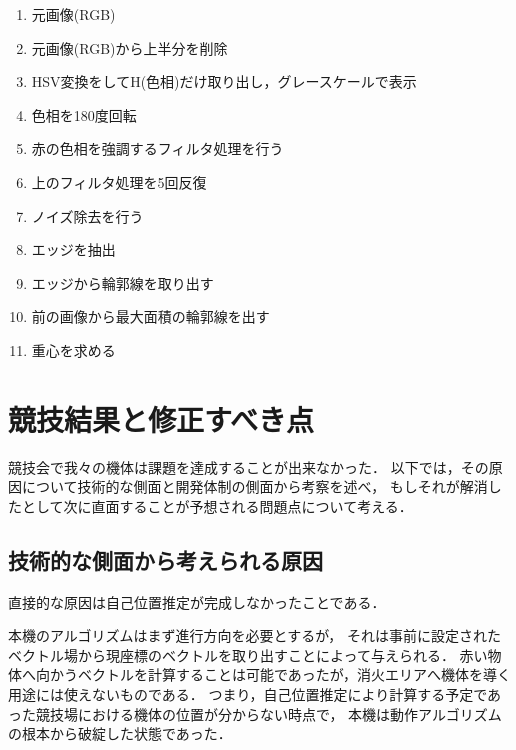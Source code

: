 \documentclass[11pt,a4]{jsarticle}
\begin{document}
    \begin{enumerate}
      \item 元画像(RGB)
      \item 元画像(RGB)から上半分を削除
      \item HSV変換をしてH(色相)だけ取り出し，グレースケールで表示
      \item 色相を180度回転
      \item 赤の色相を強調するフィルタ処理を行う
      \item 上のフィルタ処理を5回反復
      \item ノイズ除去を行う
      \item エッジを抽出
      \item エッジから輪郭線を取り出す
      \item 前の画像から最大面積の輪郭線を出す
      \item 重心を求める
    \end{enumerate}


\section{競技結果と修正すべき点}  %

  競技会で我々の機体は課題を達成することが出来なかった．
  以下では，その原因について技術的な側面と開発体制の側面から考察を述べ，
  もしそれが解消したとして次に直面することが予想される問題点について考える．

  \subsection{技術的な側面から考えられる原因}
    直接的な原因は自己位置推定が完成しなかったことである．

    本機のアルゴリズムはまず進行方向を必要とするが，
    それは事前に設定されたベクトル場から現座標のベクトルを取り出すことによって与えられる．
    赤い物体へ向かうベクトルを計算することは可能であったが，消火エリアへ機体を導く用途には使えないものである．
    つまり，自己位置推定により計算する予定であった競技場における機体の位置が分からない時点で，
    本機は動作アルゴリズムの根本から破綻した状態であった．
\end{document}
